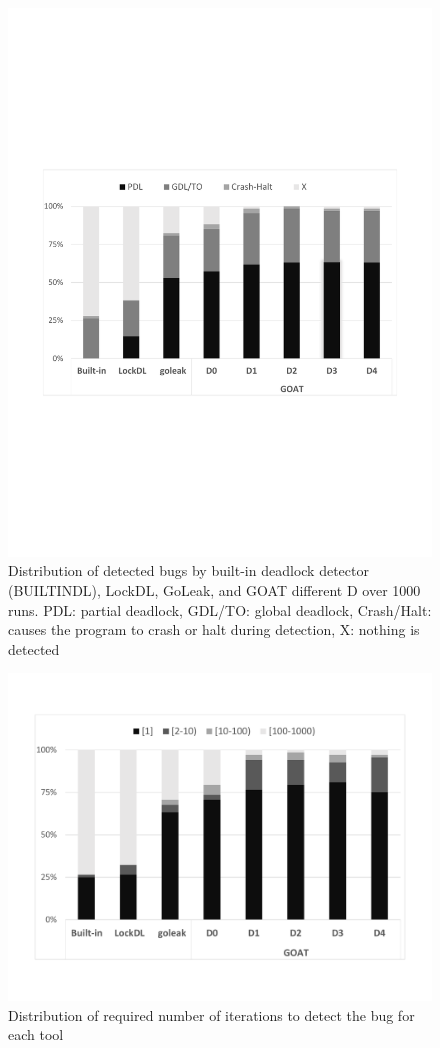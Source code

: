 \begin{figure}
\centering
  \includegraphics[width=.95\linewidth]{figs/P4_detections.pdf}
  \caption{Distribution of detected bugs by built-in deadlock detector (BUILTINDL), LockDL, GoLeak, and GOAT different D over 1000 runs. PDL: partial deadlock, GDL/TO: global deadlock, Crash/Halt: causes the program to crash or halt during detection, X: nothing is detected }
  \label{fig:detection}
\end{figure}


\begin{figure}
\centering
  \includegraphics[width=.95\linewidth]{figs/P4_runs.pdf}
  \caption{Distribution of required number of iterations to detect the bug for each tool}
  \label{fig:runs}
\end{figure}

